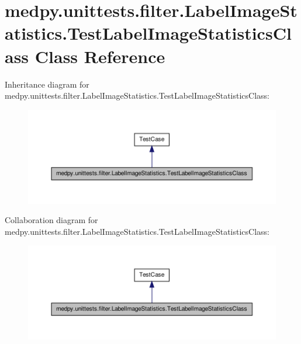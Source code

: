 \hypertarget{classmedpy_1_1unittests_1_1filter_1_1LabelImageStatistics_1_1TestLabelImageStatisticsClass}{
\section{medpy.unittests.filter.LabelImageStatistics.TestLabelImageStatisticsClass Class Reference}
\label{classmedpy_1_1unittests_1_1filter_1_1LabelImageStatistics_1_1TestLabelImageStatisticsClass}
}


Inheritance diagram for medpy.unittests.filter.LabelImageStatistics.TestLabelImageStatisticsClass:\nopagebreak
\begin{figure}[H]
\begin{center}
\leavevmode
\includegraphics[width=400pt]{classmedpy_1_1unittests_1_1filter_1_1LabelImageStatistics_1_1TestLabelImageStatisticsClass__inherit__graph}
\end{center}
\end{figure}


Collaboration diagram for medpy.unittests.filter.LabelImageStatistics.TestLabelImageStatisticsClass:\nopagebreak
\begin{figure}[H]
\begin{center}
\leavevmode
\includegraphics[width=400pt]{classmedpy_1_1unittests_1_1filter_1_1LabelImageStatistics_1_1TestLabelImageStatisticsClass__coll__graph}
\end{center}
\end{figure}
